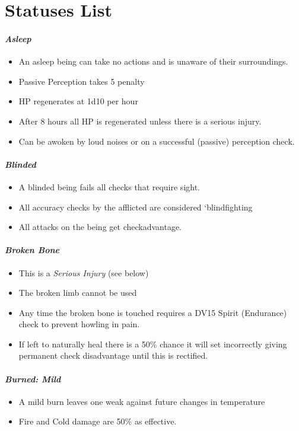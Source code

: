 
\newcommand\status[2]
{
\subsubsection{\it #1}

#2

}

\chapter{Statuses List}\label{S:StatusList}

\status{Asleep}{\begin{itemize} \renewcommand\labelitemi{\minus{}}\item An asleep being can take no actions\comma{} and is unaware of their surroundings.\item Passive Perception takes \minus{}5 penalty\item HP regenerates at 1d10 per hour\item After 8 hours all HP is regenerated\comma{} unless there is a serious injury.\item Can be awoken by loud noises\comma{} or on a successful (passive) perception check.\end{itemize}}

\status{Blinded}{\begin{itemize} \renewcommand\labelitemi{\minus{}}\item A blinded being fails all checks that require sight.\item All accuracy checks by the afflicted are considered `blindfighting\apos{}\item All attacks on the being get check\minus{}advantage.\end{itemize}}

\status{Broken Bone}{\begin{itemize} \renewcommand\labelitemi{\minus{}}\item This is a {\it Serious Injury} (see below)\item The broken limb cannot be used\item Any time the broken bone is touched\comma{} requires a DV15 Spirit (Endurance) check to prevent howling in pain.\item If left to naturally heal\comma{} there is a 50\% chance it will set incorrectly\comma{} giving permanent check disadvantage until this is rectified.\end{itemize}}

\status{Burned: Mild}{\begin{itemize} \renewcommand\labelitemi{\minus{}}\item A mild burn leaves one weak against future changes in temperature\item Fire and Cold damage are 50\% as effective.\end{itemize}}


